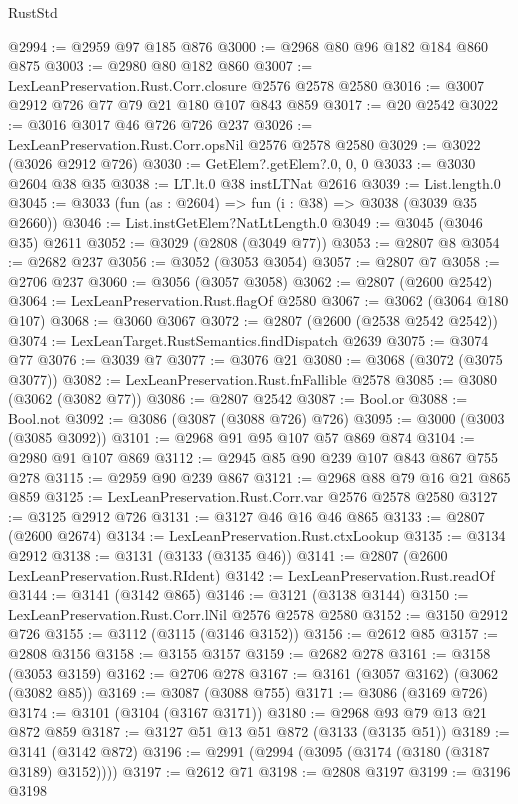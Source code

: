 \begin{lexlean}{RustStd}
\begin{coremodule}
@2994 := @2959 @97 @185 @876
@3000 := @2968 @80 @96 @182 @184 @860 @875
@3003 := @2980 @80 @182 @860
@3007 := LexLeanPreservation.Rust.Corr.closure @2576 @2578 @2580
@3016 := @3007 @2912 @726 @77 @79 @21 @180 @107 @843 @859
@3017 := @20 @2542
@3022 := @3016 @3017 @46 @726 @726 @237
@3026 := LexLeanPreservation.Rust.Corr.opsNil @2576 @2578 @2580
@3029 := @3022 (@3026 @2912 @726)
@3030 := GetElem?.getElem?.{0, 0, 0}
@3033 := @3030 @2604 @38 @35
@3038 := LT.lt.{0} @38 instLTNat @2616
@3039 := List.length.{0}
@3045 := @3033 (fun (as : @2604) => fun (i : @38) => @3038 (@3039 @35 @2660))
@3046 := List.instGetElem?NatLtLength.{0}
@3049 := @3045 (@3046 @35) @2611
@3052 := @3029 (@2808 (@3049 @77))
@3053 := @2807 @8
@3054 := @2682 @237
@3056 := @3052 (@3053 @3054)
@3057 := @2807 @7
@3058 := @2706 @237
@3060 := @3056 (@3057 @3058)
@3062 := @2807 (@2600 @2542)
@3064 := LexLeanPreservation.Rust.flagOf @2580
@3067 := @3062 (@3064 @180 @107)
@3068 := @3060 @3067
@3072 := @2807 (@2600 (@2538 @2542 @2542))
@3074 := LexLeanTarget.RustSemantics.findDispatch @2639
@3075 := @3074 @77
@3076 := @3039 @7
@3077 := @3076 @21
@3080 := @3068 (@3072 (@3075 @3077))
@3082 := LexLeanPreservation.Rust.fnFallible @2578
@3085 := @3080 (@3062 (@3082 @77))
@3086 := @2807 @2542
@3087 := Bool.or
@3088 := Bool.not
@3092 := @3086 (@3087 (@3088 @726) @726)
@3095 := @3000 (@3003 (@3085 @3092))
@3101 := @2968 @91 @95 @107 @57 @869 @874
@3104 := @2980 @91 @107 @869
@3112 := @2945 @85 @90 @239 @107 @843 @867 @755 @278
@3115 := @2959 @90 @239 @867
@3121 := @2968 @88 @79 @16 @21 @865 @859
@3125 := LexLeanPreservation.Rust.Corr.var @2576 @2578 @2580
@3127 := @3125 @2912 @726
@3131 := @3127 @46 @16 @46 @865
@3133 := @2807 (@2600 @2674)
@3134 := LexLeanPreservation.Rust.ctxLookup
@3135 := @3134 @2912
@3138 := @3131 (@3133 (@3135 @46))
@3141 := @2807 (@2600 LexLeanPreservation.Rust.RIdent)
@3142 := LexLeanPreservation.Rust.readOf
@3144 := @3141 (@3142 @865)
@3146 := @3121 (@3138 @3144)
@3150 := LexLeanPreservation.Rust.Corr.lNil @2576 @2578 @2580
@3152 := @3150 @2912 @726
@3155 := @3112 (@3115 (@3146 @3152))
@3156 := @2612 @85
@3157 := @2808 @3156
@3158 := @3155 @3157
@3159 := @2682 @278
@3161 := @3158 (@3053 @3159)
@3162 := @2706 @278
@3167 := @3161 (@3057 @3162) (@3062 (@3082 @85))
@3169 := @3087 (@3088 @755)
@3171 := @3086 (@3169 @726)
@3174 := @3101 (@3104 (@3167 @3171))
@3180 := @2968 @93 @79 @13 @21 @872 @859
@3187 := @3127 @51 @13 @51 @872 (@3133 (@3135 @51))
@3189 := @3141 (@3142 @872)
@3196 := @2991 (@2994 (@3095 (@3174 (@3180 (@3187 @3189) @3152))))
@3197 := @2612 @71
@3198 := @2808 @3197
@3199 := @3196 @3198

\end{coremodule}
\end{lexlean}
